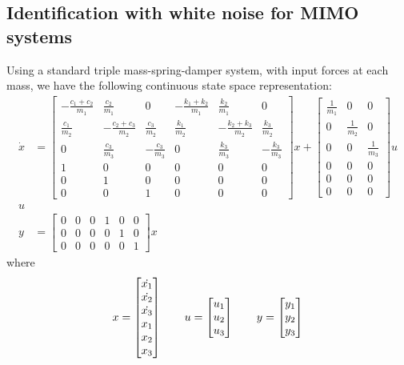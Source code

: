 \documentclass[11pt,a4paper]{article}
\begin{document}
\subsection{Identification with white noise for MIMO systems}
Using a standard triple mass-spring-damper system, with input forces at each
mass, we have the following continuous state space representation:
\begin{align}
    \dot{x} &=
        \begin{bmatrix}
            -\frac{c_1+c_2}{m_1} & \frac{c_2}{m_1} & 0 &
                -\frac{k_1+k_2}{m_1} & \frac{k_2}{m_1} & 0 \\
            \frac{c_1}{m_2} & -\frac{c_2 + c_3}{m_2} & \frac{c_3}{m_2} &
                \frac{k_1}{m_2} & -\frac{k_2 + k_3}{m_2} & \frac{k_3}{m_2} \\
            0 & \frac{c_3}{m_3} & -\frac{c_3}{m_3} &
                0 & \frac{k_3}{m_3} & -\frac{k_3}{m_3} \\
            1 & 0 & 0 & 0 & 0 & 0 \\
            0 & 1 & 0 & 0 & 0 & 0 \\
            0 & 0 & 1 & 0 & 0 & 0
        \end{bmatrix} x
        +
         \begin{bmatrix}
             \frac{1}{m_1} & 0 & 0 \\
             0 & \frac{1}{m_2} & 0 \\
             0 & 0 & \frac{1}{m_3} \\
             0 & 0 & 0 \\
             0 & 0 & 0 \\
             0 & 0 & 0
         \end{bmatrix} u \\
        u \\
    y &= \begin{bmatrix}
        0 & 0 & 0 & 1 & 0 & 0 \\
        0 & 0 & 0 & 0 & 1 & 0 \\
        0 & 0 & 0 & 0 & 0 & 1
        \end{bmatrix} x
\end{align}
where
\begin{equation*}
    x =
        \begin{bmatrix}
            \dot{x_1} \\ \dot{x_2} \\ \dot{x_3} \\ x_1 \\ x_2 \\ x_3
        \end{bmatrix} \\
        \qquad
    u =
        \begin{bmatrix}
            u_1 \\ u_2 \\ u_3
        \end{bmatrix} \\
        \qquad
    y =
        \begin{bmatrix}
            y_1 \\ y_2 \\ y_3
        \end{bmatrix}
\end{equation*}
\end{document}
